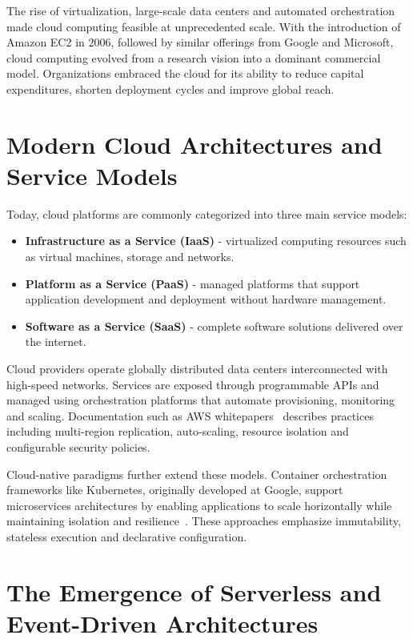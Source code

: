 The rise of virtualization, large-scale data centers and automated orchestration made cloud computing feasible at unprecedented scale. With the introduction of Amazon EC2 in 2006, followed by similar offerings from Google and Microsoft, cloud computing evolved from a research vision into a dominant commercial model. Organizations embraced the cloud for its ability to reduce capital expenditures, shorten deployment cycles and improve global reach.

\section{Modern Cloud Architectures and Service Models}
\label{sec:int_mod_clo_arc_ser}

Today, cloud platforms are commonly categorized into three main service models:

\begin{itemize}
	\item \textbf{Infrastructure as a Service (IaaS)} - virtualized computing resources such as virtual machines, storage and networks.
	\item \textbf{Platform as a Service (PaaS)} - managed platforms that support application development and deployment without hardware management.
	\item \textbf{Software as a Service (SaaS)} - complete software solutions delivered over the internet.
\end{itemize}

Cloud providers operate globally distributed data centers interconnected with high-speed networks. Services are exposed through programmable APIs and managed using orchestration platforms that automate provisioning, monitoring and scaling. Documentation such as AWS whitepapers~\cite{awsWhitepaper2024} describes practices including multi-region replication, auto-scaling, resource isolation and configurable security policies.

Cloud-native paradigms further extend these models. Container orchestration frameworks like Kubernetes, originally developed at Google, support microservices architectures by enabling applications to scale horizontally while maintaining isolation and resilience~\cite{kubernetesDesign}. These approaches emphasize immutability, stateless execution and declarative configuration.

\section{The Emergence of Serverless and Event-Driven Architectures}
\label{sec:int_eme_ser_eve_dri_arc}

